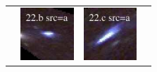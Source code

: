 \documentclass[useAMS,usenatbib]{mn2e}
\begin{document}
\begin{table}
\begin{tabular}{cccc}
    & \multicolumn{1}{m{1.7cm}}{\includegraphics[height=2.00cm,clip]{figs/enfw_img/rgb.pre_22_b_a_tri.ps}}
    & \multicolumn{1}{m{1.7cm}}{\includegraphics[height=2.00cm,clip]{figs/enfw_img/rgb.pre_22_c_a_tri.ps}} \\
  \end{tabular}

\end{table}
\end{document}
